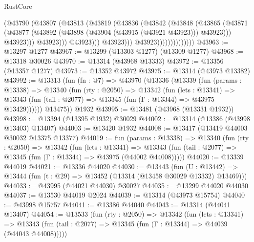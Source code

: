 \begin{lexlean}{RustCore}
\begin{coremodule}
                                      (@43790
                                        (@43807
                                          (@43813
                                            (@43819
                                              (@43836
                                                (@43842
                                                  (@43848
                                                    (@43865
                                                      (@43871
                                                        (@43877
                                                          (@43892
                                                            (@43898
                                                              (@43904 (@43915 (@43921 @43923)))
                                                              @43923)))
                                                        @43923)))
                                                  @43923)))
                                            @43923)))
                                      @43923)))
                                @43923))))))))))))))
@43963 := @13297 @1277
@43967 := @13299 (@13303 @1277) (@13309 @1277)
@43968 := @13318 @30026
@43970 := @13314 (@43968 @13333)
@43972 := @13356 (@13357 @1277)
@43973 := @13352 @43972
@43975 := @13314 (@43973 @13382)
@43992 := @13313
    (fun (fn : @7) =>
    @43970
      (@13336
        (@13339
          (fun (params : @13338) =>
          @13340
            (fun (rty : @2050) =>
            @13342
              (fun (lets : @13341) =>
              @13343 (fun (tail : @2077) => @13345 (fun (Γ : @13344) => @43975 @13429))))))
        @13475))
    @1932
@43995 := @13481 (@43968 (@13331 @1932))
@43998 := @13394 (@13395 @1932) @30029
@44002 := @13314 (@13386 (@43998 @13403) @13407)
@44003 := @13420 @1932
@44008 := @13417 (@13419 @44003 @30032 @13375 @13377)
@44019 := fun (params : @13338) =>
  @13340
    (fun (rty : @2050) =>
    @13342
      (fun (lets : @13341) =>
      @13343 (fun (tail : @2077) => @13345 (fun (Γ : @13344) => @43975 (@44002 @44008)))))
@44020 := @13339 @44019
@44021 := @13336 @44020
@44030 := @13443
    (fun (U : @13442) => @13444 (fun (t : @29) => @13452 (@13314 (@13458 @30029 @13332) @13469)))
@44033 := @43995 (@44021 @44030) @30027
@44035 := @13299 @44020 @44030
@44037 := @13530 @44019 @2024
@44039 := @13314 (@43973 @15754)
@44040 := @43998 @15757
@44041 := @13386 @44040
@44043 := @13314 (@44041 @13407)
@44054 := @13533
    (fun (rty : @2050) =>
    @13342
      (fun (lets : @13341) =>
      @13343 (fun (tail : @2077) => @13345 (fun (Γ : @13344) => @44039 (@44043 @44008)))))

\end{coremodule}
\end{lexlean}
